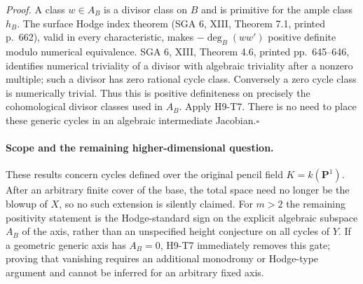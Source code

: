 \emph{Proof.} A class $w\in A_B$ is a divisor class on $B$ and is
primitive for the ample class $h_B$. The surface Hodge index theorem
(SGA 6, XIII, Theorem 7.1, printed p.~662), valid in every
characteristic, makes $-\deg_B(ww')$ positive definite modulo numerical
equivalence. SGA 6, XIII, Theorem 4.6, printed pp.~645--646, identifies
numerical triviality of a divisor with algebraic triviality after a
nonzero multiple; such a divisor has zero rational cycle class.
Conversely a zero cycle class is numerically trivial. Thus this is
positive definiteness on precisely the cohomological divisor classes
used in $A_B$. Apply H9-T7. There is
no need to place these generic cycles in an algebraic intermediate
Jacobian.\hfill$\square$

\paragraph{Scope and the remaining higher-dimensional question.}
These results concern cycles defined over the original pencil field
$K=k(\mathbf P^1)$. After an arbitrary finite cover of the base, the
total space need no longer be the blowup of $X$, so no such extension is
silently claimed. For $m>2$ the remaining positivity statement is the
Hodge-standard sign on the explicit algebraic subspace $A_B$ of the
axis, rather than an unspecified height conjecture on all cycles of
$Y$. If a geometric generic axis has $A_B=0$, H9-T7 immediately removes
this gate; proving that vanishing requires an additional monodromy or
Hodge-type argument and cannot be inferred for an arbitrary fixed axis.
